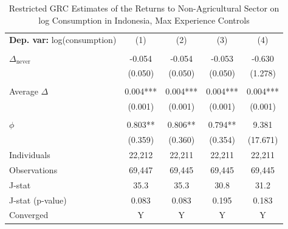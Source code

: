 \begin{table}[htbp] \centering \begin{threeparttable}
 \caption{Restricted GRC Estimates of the Returns to Non-Agricultural Sector on log Consumption in Indonesia, Max Experience Controls} 
 \label{tab:GRC_IDN_consumption_nonag_unb_exp_max} 
\begin{tabular}{l cccc} \toprule  \textbf{Dep. var:}  log(consumption) 
                    &\multicolumn{1}{c}{(1)}   &\multicolumn{1}{c}{(2)}   &\multicolumn{1}{c}{(3)}   &\multicolumn{1}{c}{(4)}   \\
                    &               &               &               &               \\
\addlinespace
$\Delta_{\text{never}}$&      -0.054   &      -0.054   &      -0.053   &      -0.630   \\
                    &     (0.050)   &     (0.050)   &     (0.050)   &     (1.278)   \\
                    &               &               &               &               \\
\addlinespace
Average $\Delta$    &       0.004***&       0.004***&       0.004***&       0.004***\\
                    &     (0.001)   &     (0.001)   &     (0.001)   &     (0.001)   \\
                    &               &               &               &               \\
\addlinespace
$\phi$              &       0.803** &       0.806** &       0.794** &       9.381   \\
                    &     (0.359)   &     (0.360)   &     (0.354)   &    (17.671)   \\
\addlinespace
Individuals         &      22,212   &      22,211   &      22,211   &      22,211   \\
Observations        &      69,447   &      69,445   &      69,445   &      69,445   \\
J-stat              &        35.3   &        35.3   &        30.8   &        31.2   \\
J-stat (p-value)    &       0.083   &       0.083   &       0.195   &       0.183   \\
Converged           &           Y   &           Y   &           Y   &           Y   \\

\end{tabular}
\end{threeparttable}
\end{table}
